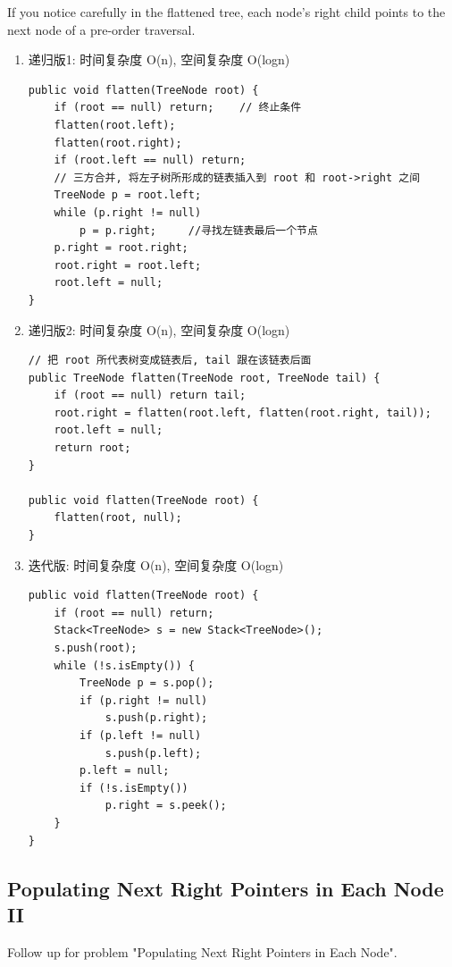 \documentclass[12pt]{book}
\begin{document}
If you notice carefully in the flattened tree, each node's right child points to the next node of a pre-order traversal.
\begin{enumerate}
\item 递归版1: 时间复杂度 O(n), 空间复杂度 O(logn)
\label{sec-4-2-11-1}

\lstset{language=java,label= ,caption= ,numbers=none}
\begin{lstlisting}
public void flatten(TreeNode root) {
    if (root == null) return;    // 终止条件
    flatten(root.left);
    flatten(root.right);
    if (root.left == null) return;
    // 三方合并, 将左子树所形成的链表插入到 root 和 root->right 之间
    TreeNode p = root.left;
    while (p.right != null) 
        p = p.right;     //寻找左链表最后一个节点
    p.right = root.right;
    root.right = root.left;
    root.left = null;
}
\end{lstlisting}

\item 递归版2: 时间复杂度 O(n), 空间复杂度 O(logn)
\label{sec-4-2-11-2}

\lstset{language=java,label= ,caption= ,numbers=none}
\begin{lstlisting}
// 把 root 所代表树变成链表后, tail 跟在该链表后面
public TreeNode flatten(TreeNode root, TreeNode tail) {
    if (root == null) return tail;
    root.right = flatten(root.left, flatten(root.right, tail));
    root.left = null;
    return root;
}

public void flatten(TreeNode root) {
    flatten(root, null);
}
\end{lstlisting}

\item 迭代版: 时间复杂度 O(n), 空间复杂度 O(logn)
\label{sec-4-2-11-3}

\lstset{language=java,label= ,caption= ,numbers=none}
\begin{lstlisting}
public void flatten(TreeNode root) {
    if (root == null) return;
    Stack<TreeNode> s = new Stack<TreeNode>();
    s.push(root);
    while (!s.isEmpty()) {
        TreeNode p = s.pop();
        if (p.right != null)
            s.push(p.right);
        if (p.left != null)
            s.push(p.left);
        p.left = null;
        if (!s.isEmpty())
            p.right = s.peek();
    }
}
\end{lstlisting}
\end{enumerate}

\subsection{Populating Next Right Pointers in Each Node II}
\label{sec-4-2-12}
Follow up for problem "Populating Next Right Pointers in Each Node".
\end{document}
